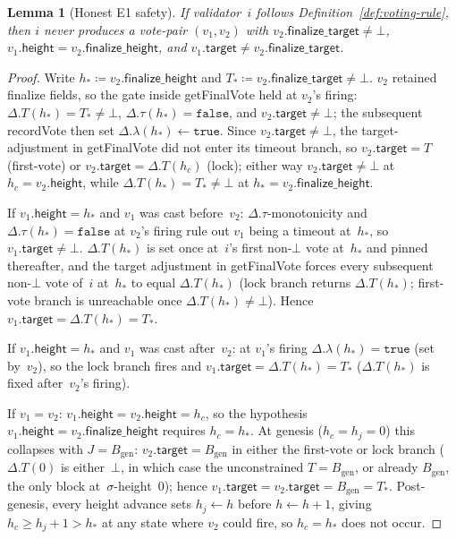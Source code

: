 \documentclass{article}
\newcommand{\genesis}{\ensuremath{B_{\mathrm{gen}}}}
\newcommand{\target}{\mathsf{target}}
\newcommand{\height}{\mathsf{height}}
\newcommand{\finalizeHeight}{\mathsf{finalize\_height}}
\newcommand{\finalizeTarget}{\mathsf{finalize\_target}}
\newcommand{\getFinalVote}{\textsf{getFinalVote}\xspace}
\newcommand{\recordVote}{\textsf{recordVote}\xspace}
\theoremstyle{plain}
\newtheorem{lemma}{Lemma}
\theoremstyle{definition}
\theoremstyle{remark}
\begin{document}
\begin{lemma}[Honest E1 safety]\label{lem:honest-e1-safety}
If validator~$i$ follows Definition~\ref{def:voting-rule}, then $i$ never produces a vote-pair $(v_1, v_2)$ with $v_2.\finalizeTarget \neq \bot$, $v_1.\height = v_2.\finalizeHeight$, and $v_1.\target \neq v_2.\finalizeTarget$.
\end{lemma}

\begin{proof}
Write $h_\ast \coloneqq v_2.\finalizeHeight$ and $T_\ast \coloneqq v_2.\finalizeTarget \neq \bot$.
$v_2$ retained finalize fields, so the gate inside \getFinalVote held at $v_2$'s firing: $\Delta.T(h_\ast) = T_\ast \neq \bot$, $\Delta.\tau(h_\ast) = \mathtt{false}$, and $v_2.\target \neq \bot$; the subsequent \recordVote then set $\Delta.\lambda(h_\ast) \gets \mathtt{true}$.
Since $v_2.\target \neq \bot$, the target-adjustment in \getFinalVote did not enter its timeout branch, so $v_2.\target = T$ (first-vote) or $v_2.\target = \Delta.T(h_c)$ (lock); either way $v_2.\target \neq \bot$ at $h_c = v_2.\height$, while $\Delta.T(h_\ast) = T_\ast \neq \bot$ at $h_\ast = v_2.\finalizeHeight$.

If $v_1.\height = h_\ast$ and $v_1$ was cast before~$v_2$: $\Delta.\tau$-monotonicity and $\Delta.\tau(h_\ast) = \mathtt{false}$ at $v_2$'s firing rule out $v_1$ being a timeout at~$h_\ast$, so $v_1.\target \neq \bot$.
$\Delta.T(h_\ast)$ is set once at~$i$'s first non-$\bot$ vote at~$h_\ast$ and pinned thereafter, and the target adjustment in \getFinalVote forces every subsequent non-$\bot$ vote of~$i$ at~$h_\ast$ to equal $\Delta.T(h_\ast)$ (lock branch returns $\Delta.T(h_\ast)$; first-vote branch is unreachable once $\Delta.T(h_\ast) \neq \bot$).
Hence $v_1.\target = \Delta.T(h_\ast) = T_\ast$.

If $v_1.\height = h_\ast$ and $v_1$ was cast after~$v_2$: at $v_1$'s firing $\Delta.\lambda(h_\ast) = \mathtt{true}$ (set by~$v_2$), so the lock branch fires and $v_1.\target = \Delta.T(h_\ast) = T_\ast$ ($\Delta.T(h_\ast)$ is fixed after~$v_2$'s firing).

If $v_1 = v_2$: $v_1.\height = v_2.\height = h_c$, so the hypothesis $v_1.\height = v_2.\finalizeHeight$ requires $h_c = h_\ast$.
At genesis ($h_c = h_j = 0$) this collapses with $J = \genesis$: $v_2.\target = \genesis$ in either the first-vote or lock branch ($\Delta.T(0)$ is either~$\bot$, in which case the unconstrained $T = \genesis$, or already $\genesis$, the only block at~$\sigma$-height~$0$); hence $v_1.\target = v_2.\target = \genesis = T_\ast$.
Post-genesis, every height advance sets $h_j \gets h$ before $h \gets h+1$, giving $h_c \geq h_j + 1 > h_\ast$ at any state where $v_2$ could fire, so $h_c = h_\ast$ does not occur.
\end{proof}
\end{document}
